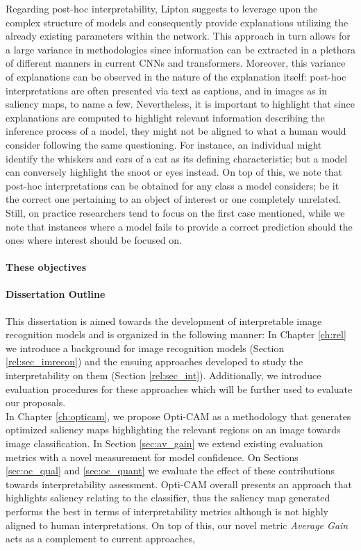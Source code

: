 \noindent Regarding post-hoc interpretability, Lipton suggests to leverage upon the complex 
structure of models and consequently provide explanations utilizing the already existing parameters 
within the network. This approach in turn allows for a large variance in methodologies since 
information can be extracted in a plethora of different manners in current CNNs and transformers. 
Moreover, this variance of explanations can be observed in the nature of the explanation itself: 
post-hoc interpretations are often presented via text as captions, and in images as in 
saliency maps, to name a few. Nevertheless, it is important to highlight that since explanations 
are computed to highlight relevant information describing the inference process of a model, they 
might not be aligned to what a human would consider following the same questioning. For instance, 
an individual might identify the whiskers and ears of a cat as its defining characteristic; but 
a model can conversely highlight the snoot or eyes instead. On top of this, we note that post-hoc 
interpretations can be obtained for any class a model considers; be it the correct one pertaining 
to an object of interest or one completely unrelated. Still, on practice researchers tend to focus 
on the first case mentioned, while we note that instances where a model fails to provide a correct 
prediction should the ones where interest should be focused on.\\


\paragraph{These objectives}
\paragraph{Dissertation Outline}
\noindent This dissertation is aimed towards the development of interpretable image recognition 
models and is organized in the following manner: In Chapter \ref{ch:rel} we 
introduce a background for image recognition models (Section \ref{rel:sec_imrecon}) and the ensuing 
approaches developed to study the interpretability on them (Section \ref{rel:sec_int}). 
Additionally, we introduce evaluation procedures for these approaches which will be further used to 
evaluate our proposals.\\

\noindent In Chapter \ref{ch:opticam}, we propose Opti-CAM as a methodology that generates 
optimized saliency maps highlighting the relevant regions on an image towards image classification. 
In Section \ref{sec:av_gain} we extend existing evaluation metrics with a novel measurement for 
model confidence. On Sections \ref{sec:oc_qual} and \ref{sec:oc_quant} we evaluate the effect of 
these contributions towards interpretability assessment. Opti-CAM overall presents an approach that 
highlights saliency relating to the classifier, thus the saliency map generated performs the best 
in terms of interpretability metrics although is not highly aligned to human interpretations. 
On top of this, our novel metric \emph{Average Gain} acts as a complement to current approaches, \\


